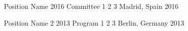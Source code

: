 

\begin{cvhonors}

  \cvhonor
    {Position Name} %
    {2016 Committee 1 2 3} %
    {Madrid, Spain} %
    {2016} %

  \cvhonor
    {Position Name 2} %
    {2013 Program 1 2 3} %
    {Berlin, Germany} %
    {2013} %

\end{cvhonors}
